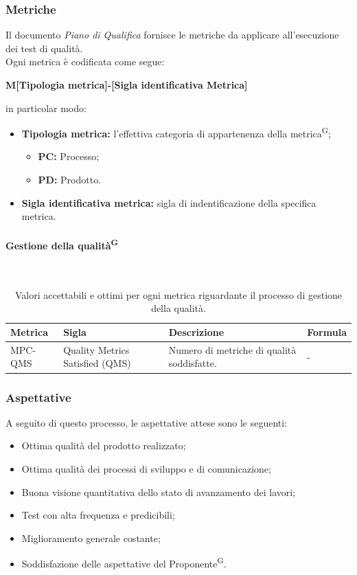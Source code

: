 \documentclass[8pt]{article}
\newcommand{\glossterm}[1]{#1\textsuperscript{G}} %
\newcommand{\subsubsubsection}[1]{\paragraph{#1}\mbox{}\\}
\begin{document}
\subsubsection{Metriche}
Il documento \textit{Piano di Qualifica} fornisce le metriche da applicare all'esecuzione dei test di qualità.
\\Ogni metrica è codificata come segue:
\begin{center}
    \textbf{M[Tipologia metrica]-[Sigla identificativa Metrica]}
\end{center}
in particolar modo:
\begin{itemize}
	\item\textbf{Tipologia metrica:} l'effettiva categoria di appartenenza della
      \glossterm{metrica};
	\begin{itemize}
    \item \textbf{PC:} Processo;
		\item \textbf{PD:} Prodotto.
	\end{itemize}
	\item\textbf{Sigla identificativa metrica:} sigla di indentificazione della specifica metrica.
\end{itemize}
\clearpage
\subsubsubsection{Gestione della \glossterm{qualità}} \label{sec:gestione_qualita}
\begin{table}[H]	
	\centering
	\begin{tabular}{p{2cm} p{3cm} p{6cm} p{4cm}}
		\toprule
		\textbf{Metrica}& \textbf{Sigla} & \textbf{Descrizione} & \textbf{Formula} \\
		\midrule
		MPC-QMS & Quality Metrics Satisfied (QMS) & Numero di metriche di qualità soddisfatte. & - \\
		\bottomrule
	\end{tabular}
	\caption{Valori accettabili e ottimi per ogni metrica riguardante il processo di gestione della qualità.}
	\label{table:Valori accettabili e ottimi per ogni metrica riguardante il processo di gestione della qualità.}
\end{table}

\subsubsection{Aspettative}
A seguito di questo processo, le aspettative attese sono le seguenti:
\begin{itemize}
    \item Ottima qualità del prodotto realizzato;
    \item Ottima qualità dei processi di sviluppo e di comunicazione;
    \item Buona visione quantitativa dello stato di avanzamento dei lavori;
    \item Test con alta frequenza e predicibili;
    \item Miglioramento generale costante;
    \item Soddisfazione delle aspettative del \glossterm{Proponente}.
\end{itemize}
\clearpage
\end{document}
